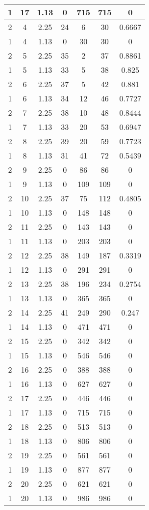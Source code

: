 \documentclass[letterpaper, 12pt]{article}
\begin{document}
\begin{longtable}{|c|c|c|c|c|c|c|}
1 & 17 & 1.13 & 0 & 715 & 715 & 0 \\
\hline
2 & 4 & 2.25 & 24 & 6 & 30 & 0.6667 \\
\hline
1 & 4 & 1.13 & 0 & 30 & 30 & 0 \\
\hline
2 & 5 & 2.25 & 35 & 2 & 37 & 0.8861 \\
\hline
1 & 5 & 1.13 & 33 & 5 & 38 & 0.825 \\
\hline
2 & 6 & 2.25 & 37 & 5 & 42 & 0.881 \\
\hline
1 & 6 & 1.13 & 34 & 12 & 46 & 0.7727 \\
\hline
2 & 7 & 2.25 & 38 & 10 & 48 & 0.8444 \\
\hline
1 & 7 & 1.13 & 33 & 20 & 53 & 0.6947 \\
\hline
2 & 8 & 2.25 & 39 & 20 & 59 & 0.7723 \\
\hline
1 & 8 & 1.13 & 31 & 41 & 72 & 0.5439 \\
\hline
2 & 9 & 2.25 & 0 & 86 & 86 & 0 \\
\hline
1 & 9 & 1.13 & 0 & 109 & 109 & 0 \\
\hline
2 & 10 & 2.25 & 37 & 75 & 112 & 0.4805 \\
\hline
1 & 10 & 1.13 & 0 & 148 & 148 & 0 \\
\hline
2 & 11 & 2.25 & 0 & 143 & 143 & 0 \\
\hline
1 & 11 & 1.13 & 0 & 203 & 203 & 0 \\
\hline
2 & 12 & 2.25 & 38 & 149 & 187 & 0.3319 \\
\hline
1 & 12 & 1.13 & 0 & 291 & 291 & 0 \\
\hline
2 & 13 & 2.25 & 38 & 196 & 234 & 0.2754 \\
\hline
1 & 13 & 1.13 & 0 & 365 & 365 & 0 \\
\hline
2 & 14 & 2.25 & 41 & 249 & 290 & 0.247 \\
\hline
1 & 14 & 1.13 & 0 & 471 & 471 & 0 \\
\hline
2 & 15 & 2.25 & 0 & 342 & 342 & 0 \\
\hline
1 & 15 & 1.13 & 0 & 546 & 546 & 0 \\
\hline
2 & 16 & 2.25 & 0 & 388 & 388 & 0 \\
\hline
1 & 16 & 1.13 & 0 & 627 & 627 & 0 \\
\hline
2 & 17 & 2.25 & 0 & 446 & 446 & 0 \\
\hline
1 & 17 & 1.13 & 0 & 715 & 715 & 0 \\
\hline
2 & 18 & 2.25 & 0 & 513 & 513 & 0 \\
\hline
1 & 18 & 1.13 & 0 & 806 & 806 & 0 \\
\hline
2 & 19 & 2.25 & 0 & 561 & 561 & 0 \\
\hline
1 & 19 & 1.13 & 0 & 877 & 877 & 0 \\
\hline
2 & 20 & 2.25 & 0 & 621 & 621 & 0 \\
\hline
1 & 20 & 1.13 & 0 & 986 & 986 & 0 \\
\hline
\end{longtable}
\end{document}
